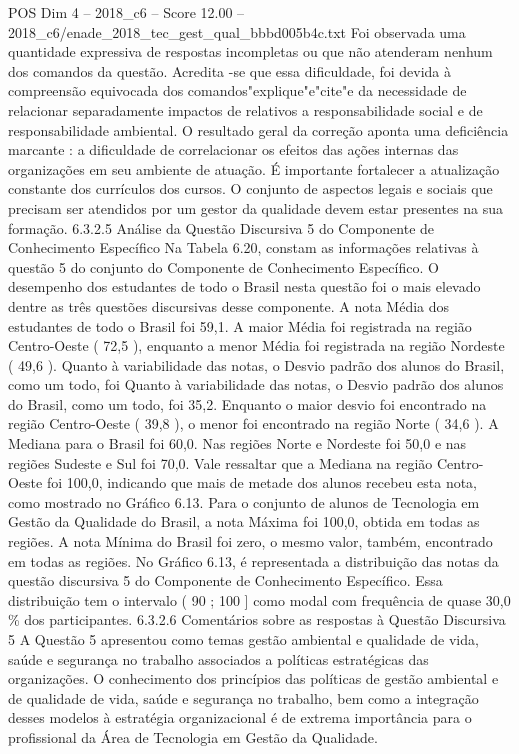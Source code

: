 \begin{textsample}{POS Dim 4 – 2018\_c6 – Score 12.00 – 2018\_c6/enade\_2018\_tec\_gest\_qual\_bbbd005b4c.txt}
Foi observada uma quantidade expressiva de respostas incompletas ou que não atenderam nenhum dos comandos da questão.
Acredita -se que essa dificuldade, foi devida à compreensão equivocada dos comandos"explique"e"cite"e da necessidade de relacionar separadamente impactos de relativos a responsabilidade social e de responsabilidade ambiental.
O resultado geral da correção aponta uma deficiência marcante : a dificuldade de correlacionar os efeitos das ações internas das organizações em seu ambiente de atuação.
É importante fortalecer a atualização constante dos currículos dos cursos.
O conjunto de aspectos legais e sociais que precisam ser atendidos por um gestor da qualidade devem estar presentes na sua formação. 6.3.2.5 Análise da Questão Discursiva 5 do Componente de Conhecimento Específico Na Tabela 6.20, constam as informações relativas à questão 5 do conjunto do Componente de Conhecimento Específico.
O desempenho dos estudantes de todo o Brasil nesta questão foi o mais elevado dentre as três questões discursivas desse componente.
A nota Média dos estudantes de todo o Brasil foi 59,1.
A maior Média foi registrada na região Centro-Oeste ( 72,5 ), enquanto a menor Média foi registrada na região Nordeste ( 49,6 ).
Quanto à variabilidade das notas, o Desvio padrão dos alunos do Brasil, como um todo, foi Quanto à variabilidade das notas, o Desvio padrão dos alunos do Brasil, como um todo, foi 35,2.
Enquanto o maior desvio foi encontrado na região Centro-Oeste ( 39,8 ), o menor foi encontrado na região Norte ( 34,6 ).
A Mediana para o Brasil foi 60,0.
Nas regiões Norte e Nordeste foi 50,0 e nas regiões Sudeste e Sul foi 70,0.
Vale ressaltar que a Mediana na região Centro-Oeste foi 100,0, indicando que mais de metade dos alunos recebeu esta nota, como mostrado no Gráfico 6.13.
Para o conjunto de alunos de Tecnologia em Gestão da Qualidade do Brasil, a nota Máxima foi 100,0, obtida em todas as regiões.
A nota Mínima do Brasil foi zero, o mesmo valor, também, encontrado em todas as regiões.
No Gráfico 6.13, é representada a distribuição das notas da questão discursiva 5 do Componente de Conhecimento Específico.
Essa distribuição tem o intervalo ( 90 ; 100 ] como modal com frequência de quase 30,0 \% dos participantes. 6.3.2.6 Comentários sobre as respostas à Questão Discursiva 5 A Questão 5 apresentou como temas gestão ambiental e qualidade de vida, saúde e segurança no trabalho associados a políticas estratégicas das organizações.
O conhecimento dos princípios das políticas de gestão ambiental e de qualidade de vida, saúde e segurança no trabalho, bem como a integração desses modelos à estratégia organizacional é de extrema importância para o profissional da Área de Tecnologia em Gestão da Qualidade.

\end{textsample}

